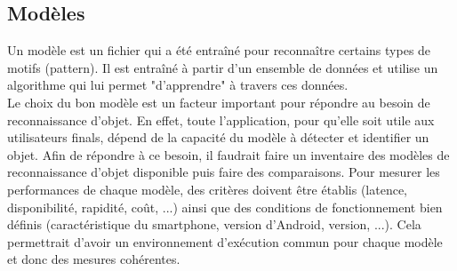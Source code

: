 \documentclass[UTF8]{EPURapport}
\begin{document}
\subsection{Modèles}
Un modèle est un fichier qui a été entraîné pour reconnaître certains types de motifs (pattern). Il est entraîné à partir d'un ensemble de données et utilise un algorithme qui lui permet "d'apprendre" à travers ces données. \\

Le choix du bon modèle est un facteur important pour répondre au besoin de reconnaissance d'objet. En effet, toute l’application, pour qu'elle soit utile aux utilisateurs finals, dépend de la capacité du modèle à détecter et identifier un objet. Afin de répondre à ce besoin, il faudrait faire un inventaire des modèles de reconnaissance d'objet disponible puis faire des comparaisons. Pour mesurer les performances de chaque modèle, des critères doivent être établis (latence, disponibilité, rapidité, coût, ...) ainsi que des conditions de fonctionnement bien définis (caractéristique du smartphone, version d'Android, version, ...). Cela permettrait d'avoir un environnement d'exécution commun pour chaque modèle et donc des mesures cohérentes.
\end{document}
